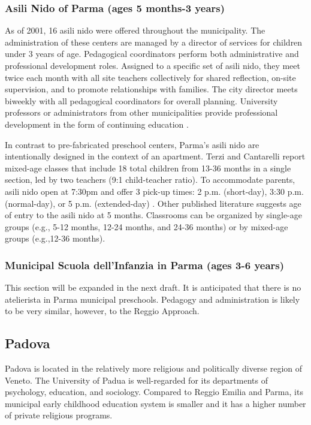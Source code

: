 \documentclass[11pt]{article}
\begin{document}
\subsubsection{Asili Nido of Parma (ages 5 months-3 years)} 

As of 2001, 16 asili nido were offered throughout the municipality. The administration of these centers are managed by a director of services for children under 3 years of age. Pedagogical coordinators perform both administrative and professional development roles. Assigned to a specific set of asili nido, they meet twice each month with all site teachers collectively for shared reflection, on-site supervision, and to promote relationships with families. The city director meets biweekly with all pedagogical coordinators for overall planning. University professors or administrators from other municipalities provide professional development in the form of continuing education \citep{Terzi-Cantarelli_2001_Parma}.

In contrast to pre-fabricated preschool centers, Parma's asili nido are intentionally designed in the context of an apartment. Terzi and Cantarelli report mixed-age classes that include 18 total children from 13-36 months in a single section, led by two teachers (9:1 child-teacher ratio). To accommodate parents, asili nido open at 7:30pm and offer 3 pick-up times: 2 p.m. (short-day), 3:30 p.m.  (normal-day), or 5 p.m. (extended-day) \citep{Terzi-Cantarelli_2001_Parma}. Other published literature suggests age of entry to the asili nido at 5 months. Classrooms can be organized by single-age groups (e.g., 5-12 months, 12-24 months, and 24-36 months) or by mixed-age groups (e.g.,12-36 months).


\subsubsection{Municipal Scuola dell'Infanzia in Parma (ages 3-6 years)}

This section will be expanded in the next draft. It is anticipated that there is no atelierista in Parma municipal preschools. Pedagogy and administration is likely to be very similar, however, to the Reggio Approach.


\subsection{Padova}
Padova is located in the relatively more religious and politically diverse region of Veneto. The University of Padua is well-regarded for its departments of psychology, education, and sociology. Compared to Reggio Emilia and Parma, its municipal early childhood education system is smaller and it has a higher number of private religious programs. 
\end{document}
